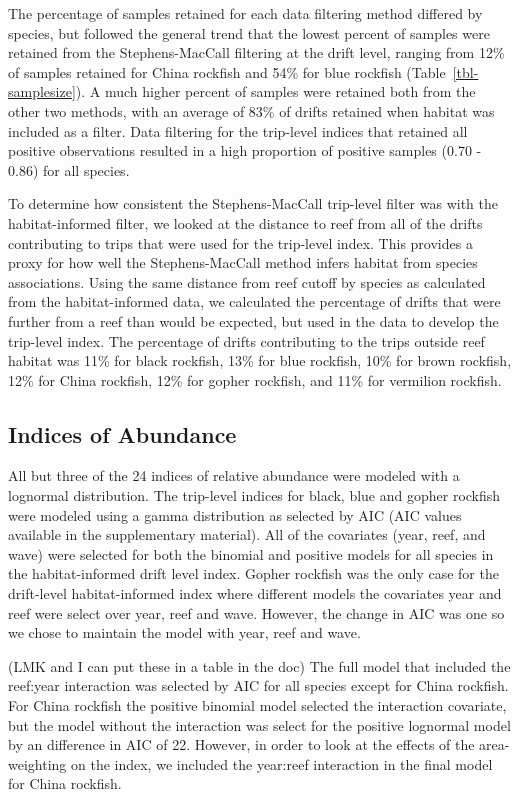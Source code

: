 \documentclass[
  12pt,
  authoryear,
  preprint,
  3p]{elsarticle}
\begin{document}
The percentage of samples retained for each data filtering method
differed by species, but followed the general trend that the lowest
percent of samples were retained from the Stephens-MacCall filtering at
the drift level, ranging from 12\% of samples retained for China
rockfish and 54\% for blue rockfish (Table~\ref{tbl-samplesize}). A much
higher percent of samples were retained both from the other two methods,
with an average of 83\% of drifts retained when habitat was included as
a filter. Data filtering for the trip-level indices that retained all
positive observations resulted in a high proportion of positive samples
(0.70 - 0.86) for all species.

To determine how consistent the Stephens-MacCall trip-level filter was
with the habitat-informed filter, we looked at the distance to reef from
all of the drifts contributing to trips that were used for the
trip-level index. This provides a proxy for how well the
Stephens-MacCall method infers habitat from species associations. Using
the same distance from reef cutoff by species as calculated from the
habitat-informed data, we calculated the percentage of drifts that were
further from a reef than would be expected, but used in the data to
develop the trip-level index. The percentage of drifts contributing to
the trips outside reef habitat was 11\% for black rockfish, 13\% for
blue rockfish, 10\% for brown rockfish, 12\% for China rockfish, 12\%
for gopher rockfish, and 11\% for vermilion rockfish.

\hypertarget{indices-of-abundance-1}{%
\subsection{Indices of Abundance}\label{indices-of-abundance-1}}

All but three of the 24 indices of relative abundance were modeled with
a lognormal distribution. The trip-level indices for black, blue and
gopher rockfish were modeled using a gamma distribution as selected by
AIC (AIC values available in the supplementary material). All of the
covariates (year, reef, and wave) were selected for both the binomial
and positive models for all species in the habitat-informed drift level
index. Gopher rockfish was the only case for the drift-level
habitat-informed index where different models the covariates year and
reef were select over year, reef and wave. However, the change in AIC
was one so we chose to maintain the model with year, reef and wave.

(LMK and I can put these in a table in the doc) The full model that
included the reef:year interaction was selected by AIC for all species
except for China rockfish. For China rockfish the positive binomial
model selected the interaction covariate, but the model without the
interaction was select for the positive lognormal model by an difference
in AIC of 22. However, in order to look at the effects of the
area-weighting on the index, we included the year:reef interaction in
the final model for China rockfish.
\end{document}
